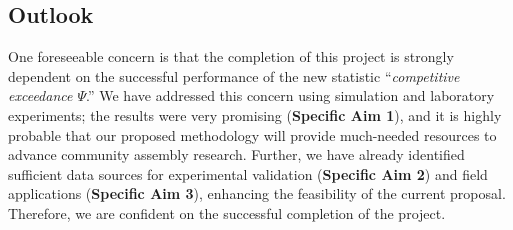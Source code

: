 \documentclass[12pt, class=article, crop=false]{standalone}
\begin{document}



\subsection*{Outlook}

One foreseeable concern is that the completion of this project is strongly dependent on the successful performance of the new statistic ``\textit{competitive exceedance $\Psi$}.''
We have addressed this concern using simulation and laboratory experiments; the results were very promising (\textbf{Specific Aim 1}), and it is highly probable that our proposed methodology will provide much-needed resources to advance community assembly research.
Further, we have already identified sufficient data sources for experimental validation (\textbf{Specific Aim 2}) and field applications (\textbf{Specific Aim 3}), enhancing the feasibility of the current proposal.
Therefore, we are confident on the successful completion of the project.
\end{document}
